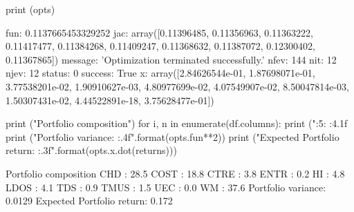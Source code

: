 \begin{solution}
\begin{ipython}
print (opts)
\end{ipython}
\begin{ioutput}
    fun: 0.1137665453329252
    jac: array([0.11396485, 0.11356963, 0.11363222, 0.11417477, 0.11384268,
                0.11409247, 0.11368632, 0.11387072, 0.12300402, 0.11367865])
message: 'Optimization terminated successfully.'
   nfev: 144
    nit: 12
   njev: 12
 status: 0
success: True
      x: array([2.84626544e-01, 1.87698071e-01, 3.77538201e-02, 
                1.90910627e-03, 4.80977699e-02, 4.07549907e-02, 
                8.50047814e-03, 1.50307431e-02, 4.44522891e-18, 
                3.75628477e-01])
\end{ioutput}
\begin{ipython}
print ("Portfolio composition")
for i, n in enumerate(df.columns):
    print ("{:5}: {:4.1f}%
print ("Portfolio variance: {:.4f}".format(opts.fun**2))
print ("Expected Portfolio return: {:.3f}".format(opts.x.dot(returns)))
\end{ipython}
\begin{ioutput}
Portfolio composition
CHD  : 28.5%
COST : 18.8%
CTRE : 3.8%
ENTR : 0.2%
HI   : 4.8%
LDOS : 4.1%
TDS  : 0.9%
TMUS : 1.5%
UEC  : 0.0%
WM   : 37.6%
Portfolio variance: 0.0129
Expected Portfolio return: 0.172
\end{ioutput}
\end{solution}

